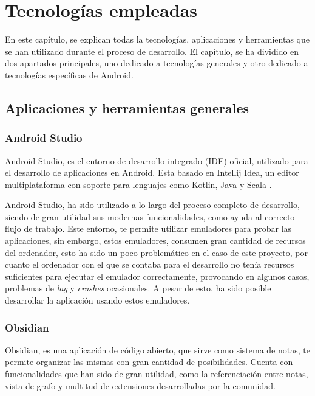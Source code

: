 \chapter{Tecnologías empleadas}
\label{cap:tecnologiasEmpleadas}
En este capítulo, se explican todas la tecnologías, aplicaciones y herramientas que se han utilizado durante el proceso de desarrollo. El capítulo, se ha dividido en dos apartados principales, uno dedicado a tecnologías generales y otro dedicado a tecnologías específicas de Android.

\section{Aplicaciones y herramientas generales}
\hypertarget{subsec:android_studio}{}
\subsection{Android Studio}
Android Studio\hyperlink{cap:biblio}{}, es el entorno de desarrollo integrado (IDE) oficial, utilizado para el desarrollo de aplicaciones en Android. Esta basado en Intellij Idea\hyperlink{cap:biblio}{}, un editor multiplataforma con soporte para lenguajes como \hyperlink{subsec:kotlin}{Kotlin}, 
Java\hyperlink{cap:biblio}{} y Scala \hyperlink{cap:biblio}{}. 

Android Studio, ha sido utilizado a lo largo del proceso completo de desarrollo, siendo de gran utilidad sus modernas funcionalidades, como ayuda al correcto flujo de trabajo. Este entorno, te permite utilizar emuladores para probar las aplicaciones, sin embargo, estos emuladores, consumen gran cantidad de recursos del ordenador, esto ha sido un poco problemático en el caso de este proyecto, por cuanto el ordenador con el que se contaba para el desarrollo no tenía recursos suficientes para ejecutar el emulador correctamente, provocando en algunos casos, problemas de \textit{lag} y \textit{crashes} ocasionales. A pesar de esto, ha sido posible desarrollar la aplicación usando estos emuladores.

\subsection{Obsidian}
Obsidian\hyperlink{cap:biblio}{}, es una aplicación de código abierto, que sirve como sistema de notas, te permite organizar las mismas con gran cantidad de posibilidades. Cuenta con funcionalidades que han sido de gran utilidad, como la referenciación entre notas, vista de grafo y multitud de extensiones desarrolladas por la comunidad.

